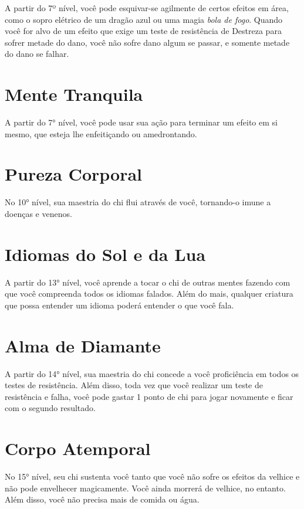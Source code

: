 \begin{multicols}{2}
A partir do 7º nível, você pode esquivar-se agilmente de certos efeitos em área,
como o sopro elétrico de um dragão azul ou uma magia \textit{bola de fogo}.
Quando você for alvo de um efeito que exige um teste de resistência de Destreza
para sofrer metade do dano, você não sofre dano algum se passar, e somente
metade do dano se falhar.

\section*{Mente Tranquila}%
\label{sec:mente_tranquila}

A partir do 7° nível, você pode usar sua ação para terminar um efeito em si
mesmo, que esteja lhe enfeitiçando ou amedrontando.

\section*{Pureza Corporal}%
\label{sec:pureza_corporal}

No 10° nível, sua maestria do chi flui através de você, tornando-o imune a
doenças e venenos.

\section*{Idiomas do Sol e da Lua}%
\label{sec:idiomas_do_sol_e_da_lua}

A partir do 13° nível, você aprende a tocar o chi de outras mentes fazendo com
que você compreenda todos os idiomas falados. Além do mais, qualquer criatura
que possa entender um idioma poderá entender o que você fala.

\section*{Alma de Diamante}%
\label{sec:alma_de_diamante}

A partir do 14° nível, sua maestria do chi concede a você proficiência em todos
os testes de resistência. Além disso, toda vez que você realizar um teste de
resistência e falha, você pode gastar 1 ponto de chi para jogar novamente e
ficar com o segundo resultado.

\section*{Corpo Atemporal}%
\label{sec:corpo_atemporal}

No 15° nível, seu chi sustenta você tanto que você não sofre os efeitos da
velhice e não pode envelhecer magicamente. Você ainda morrerá de velhice, no
entanto. Além disso, você não precisa mais de comida ou água.


\end{multicols}
